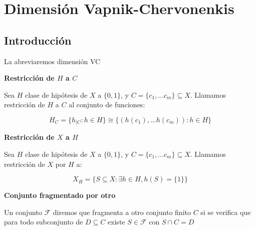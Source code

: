 \section{Dimensión Vapnik-Chervonenkis}
\subsection{Introducción}
La abreviaremos dimensión VC

\begin{definition}
\textbf{Restricción de $H$ a $C$}

Sea $H$ clase de hipótesis de $X$ a $\{0,1\}$, y $C=\{c_1, \ldots c_m\} \subseteq X$. 
Llamamos restricción de $H$ a $C$ al conjunto de funciones:

\[H_{C} = \{h_{|C} : h\in H\} \cong \{(h(c_1), \ldots h(c_m)): h\in H\}\]
\end{definition}


\begin{definition}
\textbf{Restricción de $X$ a $H$}

Sea $H$ clase de hipótesis de $X$ a $\{0,1\}$, y $C=\{c_1, \ldots c_m\} \subseteq X$. Llamamos restricción de $X$ por $H$ a:

\[X_{H} = \{S \subseteq X: \exists h\in H, h(S)=\{1\} \}\]
\end{definition}


\begin{definition}
\textbf{Conjunto fragmentado por otro}

Un conjunto $\mathcal{F}$ diremos que fragmenta a otro conjunto finito $C$ si se verifica que para todo subconjunto de $D \subseteq C$ existe $S\in \mathcal{F}$ con $S \cap C = D$
\end{definition}


